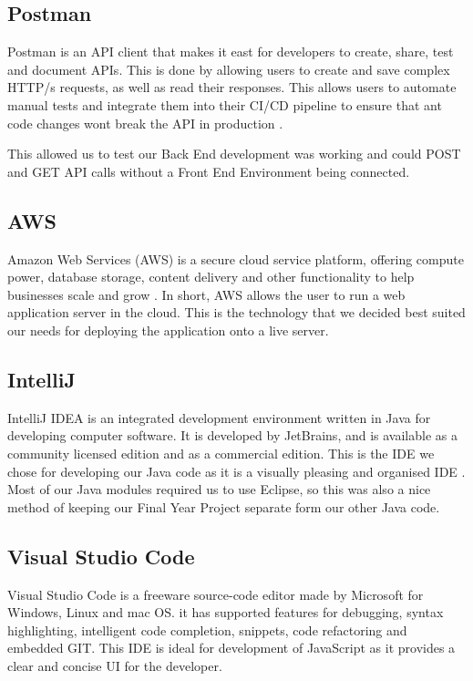 \subsection{Postman}
Postman is an API client that makes it east for developers to create, share, test and document APIs. This is done by allowing users to create and save complex HTTP/s requests, as well as read their responses. This allows users to automate manual tests and integrate them into their CI/CD pipeline to ensure that ant code changes wont break the API in production \cite{PostMan}. \par
This allowed us to test our Back End development was working and could POST and GET API calls without a Front End Environment being connected.

\subsection{AWS}
Amazon Web Services (AWS) is a secure cloud service platform, offering compute power, database storage, content delivery and other functionality to help businesses scale and grow \cite{AWS}. In short, AWS allows the user to run a web application server in the cloud. This is the technology that we decided best suited our needs for deploying the application onto a live server.

\subsection{IntelliJ}
IntelliJ IDEA is an integrated development environment written in Java for developing computer software. It is developed by JetBrains, and is available as a community licensed edition and as a commercial edition. This is the IDE we chose for developing our Java code as it is a visually pleasing and organised IDE \cite{IntelliJ}. Most of our Java modules required us to use Eclipse, so this was also a nice method of keeping our Final Year Project separate form our other Java code.

\subsection{Visual Studio Code}
Visual Studio Code is a freeware source-code editor made by Microsoft for Windows, Linux and mac OS. it has supported features for debugging, syntax highlighting, intelligent code completion, snippets, code refactoring and embedded GIT. This IDE is ideal for development of JavaScript as it provides a clear and concise UI for the developer.

